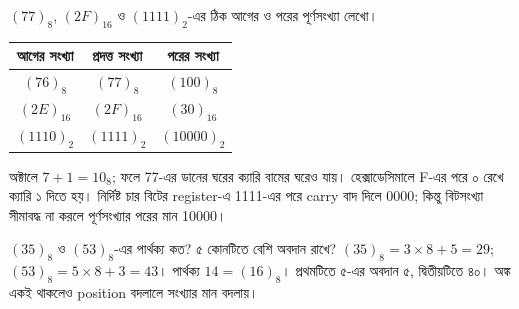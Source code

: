 $(77)_8$, $(2F)_{16}$ ও $(1111)_2$-এর ঠিক আগের ও পরের পূর্ণসংখ্যা লেখো।
\chThreeAnswer
\begin{center}\begin{tabular}{|c|c|c|}\hline
আগের সংখ্যা & প্রদত্ত সংখ্যা & পরের সংখ্যা\\\hline
$(76)_8$ & $(77)_8$ & $(100)_8$\\\hline
$(2E)_{16}$ & $(2F)_{16}$ & $(30)_{16}$\\\hline
$(1110)_2$ & $(1111)_2$ & $(10000)_2$\\\hline
\end{tabular}\end{center}
অক্টালে $7+1=10_8$; ফলে 77-এর ডানের ঘরের ক্যারি বামের ঘরেও যায়। হেক্সাডেসিমালে F-এর পরে ০ রেখে ক্যারি ১ দিতে হয়। নির্দিষ্ট চার বিটের register-এ 1111-এর পরে carry বাদ দিলে 0000; কিন্তু বিটসংখ্যা সীমাবদ্ধ না করলে পূর্ণসংখ্যার পরের মান 10000।

$(35)_8$ ও $(53)_8$-এর পার্থক্য কত? ৫ কোনটিতে বেশি অবদান রাখে?
\chThreeAnswer $(35)_8=3\times8+5=29$; $(53)_8=5\times8+3=43$। পার্থক্য $14=(16)_8$। প্রথমটিতে ৫-এর অবদান ৫, দ্বিতীয়টিতে ৪০। অঙ্ক একই থাকলেও position বদলালে সংখ্যার মান বদলায়।
